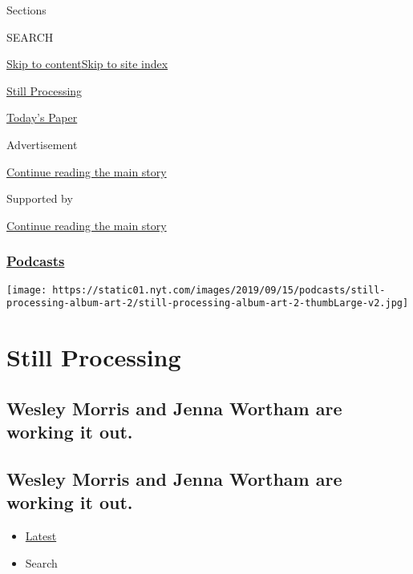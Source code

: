 Sections

SEARCH

\protect\hyperlink{site-content}{Skip to
content}\protect\hyperlink{site-index}{Skip to site index}

\href{https://www.nytimes.com/column/still-processing-podcast}{Still
Processing}

\href{https://myaccount.nytimes.com/auth/login?response_type=cookie\&client_id=vi}{}

\href{https://www.nytimes.com/section/todayspaper}{Today's Paper}

Advertisement

\protect\hyperlink{after-top}{Continue reading the main story}

Supported by

\protect\hyperlink{after-sponsor}{Continue reading the main story}

\hypertarget{podcasts}{%
\subsubsection{\texorpdfstring{\href{/spotlight/podcasts}{Podcasts}}{Podcasts}}\label{podcasts}}

\texttt{[image: https://static01.nyt.com/images/2019/09/15/podcasts/still-processing-album-art-2/still-processing-album-art-2-thumbLarge-v2.jpg]}

\hypertarget{still-processing}{%
\section{Still Processing}\label{still-processing}}

\hypertarget{wesley-morris-and-jenna-wortham-are-working-it-out}{%
\subsection{Wesley Morris and Jenna Wortham are working it
out.}\label{wesley-morris-and-jenna-wortham-are-working-it-out}}

\hypertarget{wesley-morris-and-jenna-wortham-are-working-it-out-1}{%
\subsection{Wesley Morris and Jenna Wortham are working it
out.}\label{wesley-morris-and-jenna-wortham-are-working-it-out-1}}

\begin{itemize}
\tightlist
\item
  \protect\hyperlink{stream-panel}{Latest}
\item
  Search
\end{itemize}

